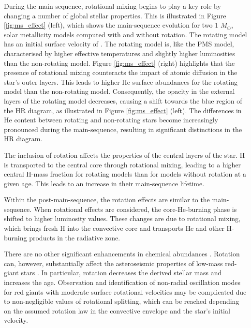 During the main-sequence, rotational mixing begins to play a key role by changing a number of global stellar properties. 
This is illustrated in Figure \ref{fig:ms_effect} (left), which shows the main-sequence evolution for two 1 $M_{\odot}$, solar metallicity models computed with and without rotation.
The rotating model has an initial surface velocity of .
The rotating model is, like the PMS model, characterised by higher effective temperatures and slightly higher luminosities than the non-rotating model.
Figure \ref{fig:ms_effect} (right) highlights that the presence of rotational mixing counteracts the impact of atomic diffusion in the star's outer layers. 
This leads to higher He surface abundances for the rotating model than the non-rotating model.
Consequently, the opacity in the external layers of the rotating model decreases, causing a shift towards the blue region of the HR diagram, as illustrated in Figure \ref{fig:ms_effect} (left). 
The differences in He content between rotating and non-rotating stars become increasingly pronounced during the main-sequence, resulting in significant distinctions in the HR diagram.

The inclusion of rotation affects the properties of the central layers of the star. 
H is transported to the central core through rotational mixing, leading to a higher central H-mass fraction for rotating models than for models without rotation at a given age. 
This leads to an increase in their main-sequence lifetime.

Within the post-main-sequence, the rotation effects are similar to the main-sequence.
When rotational effects are considered, the core-He-burning phase is shifted to higher luminosity values. 
These changes are due to rotational mixing, which brings fresh H into the convective core and transports He and other H-burning products in the radiative zone.

There are no other significant enhancements in chemical abundances \citep[see Table 2 in][]{lagarde_thermohaline_2012}.
Rotation can, however, substantially affect the asteroseismic properties of low-mass red-giant stars \citep{lagarde_thermohaline_2012, eggenberger_effects_2010}.
In particular, rotation decreases the derived stellar mass and increases the age.
Observation and identification of non-radial oscillation modes for red giants with moderate surface rotational velocities may be complicated due to non-negligible values of rotational splitting, which can be reached depending on the assumed rotation law in the convective envelope and the star's initial velocity.\\
 \\
 \\



